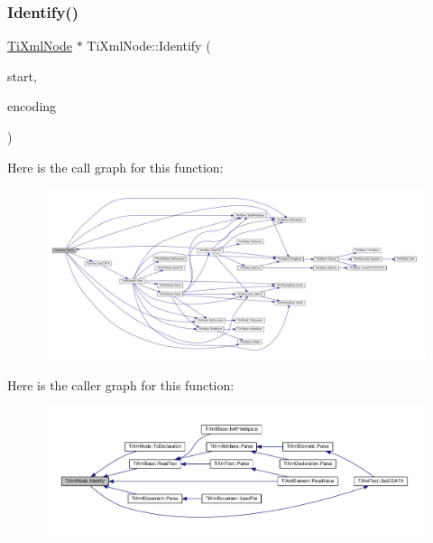 \mbox{\label{class_ti_xml_node_ac1e3a8e7578be463b04617786120c2bb}} 
\subsubsection{\texorpdfstring{Identify()}{Identify()}}
{\footnotesize\ttfamily \hyperlink{class_ti_xml_node}{Ti\+Xml\+Node} $\ast$ Ti\+Xml\+Node\+::\+Identify (\begin{DoxyParamCaption}\item[{const char $\ast$}]{start,  }\item[{\hyperlink{tinyxml_8h_a88d51847a13ee0f4b4d320d03d2c4d96}{Ti\+Xml\+Encoding}}]{encoding }\end{DoxyParamCaption})\hspace{0.3cm}{\ttfamily [protected]}}

Here is the call graph for this function\+:
\nopagebreak
\begin{figure}[H]
\begin{center}
\leavevmode
\includegraphics[width=350pt]{class_ti_xml_node_ac1e3a8e7578be463b04617786120c2bb_cgraph}
\end{center}
\end{figure}
Here is the caller graph for this function\+:
\nopagebreak
\begin{figure}[H]
\begin{center}
\leavevmode
\includegraphics[width=350pt]{class_ti_xml_node_ac1e3a8e7578be463b04617786120c2bb_icgraph}
\end{center}
\end{figure}
\mbox{\label{class_ti_xml_node_a274db3292218202805c093f66a964cb5}} 
